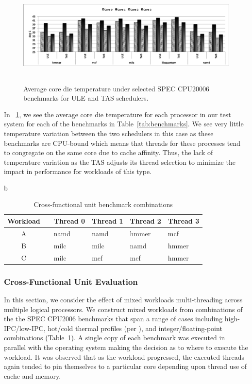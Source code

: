 \documentclass[times, 10pt,twocolumn]{IEEEtran}
\begin{document}
\begin{figure}[!tbhp] \centering
  \includegraphics[width=1.0\linewidth,height=2in]{graphics/speccputemp}
  \caption{Average core die temperature under selected SPEC CPU20006
benchmarks for ULE and TAS schedulers.}
  \label{fig:ubenchmarks}
\end{figure} 
In \figurename~\ref{fig:ubenchmarks}, we see the average
core die temperature for each processor in our test system for each of
the benchmarks in Table~\ref{tab:benchmarks}.  We see very little
temperature variation between the two schedulers in this case as these
benchmarks are CPU-bound which means that threads for these processes
tend to congregate on the same core due to cache affinity.  Thus, the
lack of temperature variation as the TAS adjusts its thread selection to
minimize the impact in performance for workloads of this type.

\begin{table}[bp]
  \caption{Cross-functional unit benchmark combinations}
  \label{tab:crossbench}b \centering
  \begin{tabular}{clllll} \hline Workload & & Thread 0 & Thread 1 &
Thread 2 & Thread 3 \\ \hline \hline A & & namd & namd & hmmer & mcf \\
B & & milc & milc & namd & hmmer \\ C & & milc & mcf & mcf & hmmer \\
\hline
  \end{tabular}
\end{table}
\subsubsection{Cross-Functional Unit Evaluation}
\label{sec:cross-funct-unit} In this section, we consider the effect of
mixed workloads multi-threading across multiple logical processors.  We
construct mixed workloads from combinations of the the SPEC CPU2006
benchmarks that span a range of cases including high-IPC/low-IPC,
hot/cold thermal profiles (per \cite{Kursun2008}), and
integer/floating-point combinations (Table~\ref{tab:crossbench}). A
single copy of each benchmark was executed in parallel with the
operating system making the decision as to where to execute the
workload.  It was observed that as the workload progressed, the executed
threads again tended to pin themselves to a particular core depending
upon thread use of cache and memory.
\end{document}
